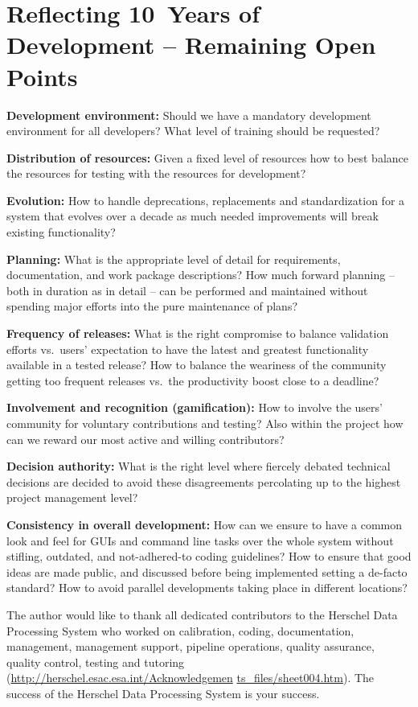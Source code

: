 \section{Reflecting 10~Years of Development -- Remaining Open Points}
\begin{description}\addtolength{\itemsep}{-0.6\baselineskip}
\item {\bf Development environment:} Should we have a mandatory development environment for all developers? What level of training should be requested?
\item {\bf Distribution of resources:} Given a fixed level of resources how to best balance the resources for testing with the resources for development?
\item {\bf Evolution:} How to handle deprecations, replacements and standardization for a system that evolves over a decade as much needed improvements will break existing functionality?
\item {\bf Planning:} What is the appropriate level of detail for requirements, documentation, and work package descriptions? How much forward planning -- both in duration as in detail -- can be performed and maintained without spending major efforts into the pure maintenance of plans?
\item {\bf Frequency of releases:} What is the right compromise to balance validation efforts vs.\ users' expectation to have the latest and greatest functionality available in a tested release? How to balance the weariness of the community getting too frequent releases vs.\ the productivity boost close to a deadline?
\item {\bf Involvement and recognition (gamification):} How to involve the users' community for voluntary contributions and testing? Also within the project how can we reward our most active and willing contributors?
\item {\bf Decision authority:} What is the right level where fiercely debated technical decisions are decided to avoid these disagreements percolating up to the highest project management level?
\item {\bf Consistency in overall development:} How can we ensure to have a common look and feel for GUIs and command line tasks over the whole system without stifling, outdated, and not-adhered-to coding guidelines? How to ensure that good ideas are made public, and discussed before being implemented setting a de-facto standard? How to avoid parallel developments taking place in different locations?
\end {description}

\acknowledgements The author would like to thank all dedicated contributors to the Herschel Data Processing System who worked on calibration, coding, documentation, management, management support, pipeline operations, quality assurance, quality control, testing and tutoring (\url{http://herschel.esac.esa.int/Acknowledgemen} \url{ts_files/sheet004.htm}). The success of the Herschel Data Processing System is your success.


